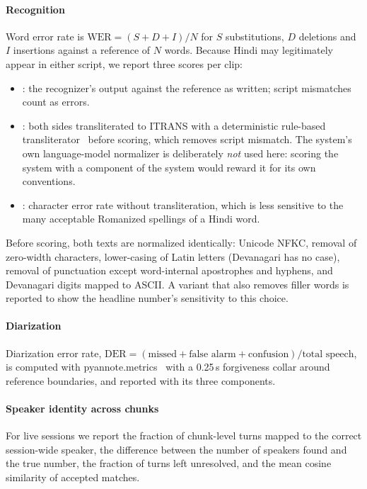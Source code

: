 \paragraph{Recognition}
Word error rate is
$\mathrm{WER} = (S + D + I)/N$ for $S$ substitutions, $D$ deletions and $I$
insertions against a reference of $N$ words. Because Hindi may legitimately
appear in either script, we report three scores per clip:
\begin{itemize}
  \item \werraw{}: the recognizer's output against the reference as written;
    script mismatches count as errors.
  \item \werrom{}: both sides transliterated to ITRANS with a deterministic
    rule-based transliterator~\cite{indictransliteration} before scoring, which
    removes script mismatch. The system's own language-model normalizer is
    deliberately \emph{not} used here: scoring the system with a component of
    the system would reward it for its own conventions.
  \item \cerraw{}: character error rate without transliteration, which is less
    sensitive to the many acceptable Romanized spellings of a Hindi word.
\end{itemize}
Before scoring, both texts are normalized identically: Unicode NFKC, removal of
zero-width characters, lower-casing of Latin letters (Devanagari has no case),
removal of punctuation except word-internal apostrophes and hyphens, and
Devanagari digits mapped to ASCII. A variant that also removes filler words is
reported to show the headline number's sensitivity to this choice.

\paragraph{Diarization}
Diarization error rate,
$\mathrm{DER} = (\text{missed} + \text{false alarm} + \text{confusion}) /
\text{total speech}$, is computed with
pyannote.metrics~\cite{bredin2017pyannotemetrics} with a 0.25\,s forgiveness
collar around reference boundaries, and reported with its three components.

\paragraph{Speaker identity across chunks}
For live sessions we report the fraction of chunk-level turns mapped to the
correct session-wide speaker, the difference between the number of speakers
found and the true number, the fraction of turns left unresolved, and the mean
cosine similarity of accepted matches.

